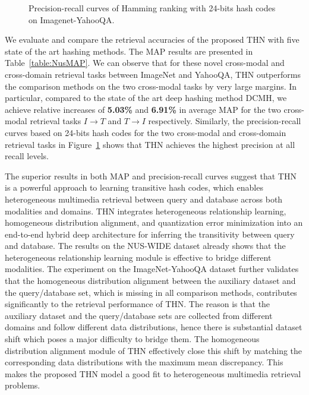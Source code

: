 \documentclass{article}
\begin{document}
\begin{figure}[!thp]
    \centering
		\hfil
    \vspace{-5pt}
    \caption{Precision-recall curves of Hamming ranking with 24-bits hash codes on Imagenet-YahooQA. }
    \label{fig:pr_iy}
    \vspace{-10pt}
\end{figure}

We evaluate and compare the retrieval accuracies of the proposed THN with five state of the art hashing methods. The MAP results are presented in Table~\ref{table:NusMAP}. We can observe that for these novel cross-modal and cross-domain retrieval tasks between ImageNet and YahooQA, THN outperforms the comparison methods on the two cross-modal tasks by very large margins. In particular, compared to the state of the art deep hashing method DCMH, we achieve relative increases of \textbf{5.03\%} and \textbf{6.91\%} in average MAP for the two cross-modal retrieval tasks $I \to T$ and $T \to I$ respectively. Similarly, the precision-recall curves based on 24-bits hash codes for the two cross-modal and cross-domain retrieval tasks in Figure~\ref{fig:pr_iy} shows that THN achieves the highest precision at all recall levels. 

The superior results in both MAP and precision-recall curves suggest that THN is a powerful approach to learning transitive hash codes, which enables heterogeneous multimedia retrieval between query and database across both modalities and domains. THN integrates heterogeneous relationship learning, homogeneous distribution alignment, and quantization error minimization into an end-to-end hybrid deep architecture for inferring the transitivity between query and database. The results on the NUS-WIDE dataset already shows that the heterogeneous relationship learning module is effective to bridge different modalities. The experiment on the ImageNet-YahooQA dataset further validates that the homogeneous distribution alignment between the auxiliary dataset and the query/database set, which is missing in all comparison methods, contributes significantly to the retrieval performance of THN. The reason is that the auxiliary dataset and the query/database sets are collected from different domains and follow different data distributions, hence there is substantial dataset shift which poses a major difficulty to bridge them. The homogeneous distribution alignment module of THN effectively close this shift by matching the corresponding data distributions with the maximum mean discrepancy. This makes the proposed THN model a good fit to heterogeneous multimedia retrieval problems.
\end{document}
